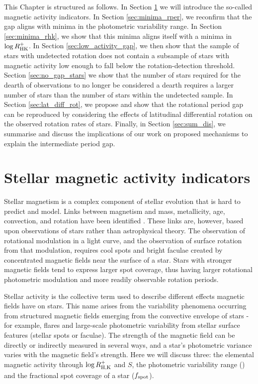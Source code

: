 This Chapter is structured as follows. In Section \ref{sec:act_ind} we will introduce the so-called magnetic activity indicators. 
In Section \ref{sec:minima_rper}, we reconfirm that the gap aligns with minima in the photometric variability range. 
In Section \ref{sec:minima_rhk}, we show that this minima aligns itself with a minima in $\log R^{+}_{\rm{HK}}$.
In Section \ref{sec:low_activity_gap}, we then show that the sample of stars with undetected rotation does not contain a subsample of stars with magnetic activity low enough to fall below the rotation-detection threshold.
Section \ref{sec:no_gap_stars} we show that the number of stars required for the dearth of observations to no longer be considered a dearth requires a larger number of stars than the number of stars within the undetected sample.
In Section \ref{sec:lat_diff_rot}, we propose and show that the rotational period gap can be reproduced by considering the effects of latitudinal differential rotation on the observed rotation rates of stars.
Finally, in Section \ref{sec:sum_dis}, we summarise and discuss the implications of our work on proposed mechanisms to explain the intermediate period gap.


\section{Stellar magnetic activity indicators}
\label{sec:act_ind}

Stellar magnetism is a complex component of stellar evolution that is hard to predict and model.
Links between magnetism and mass, metallicity, age, convection, and rotation have been identified \citep{cao_starspots_2022}.
These links are, however, based upon observations of stars rather than astrophysical theory.
The observation of rotational modulation in a light curve, and the observation of surface rotation from that modulation, requires cool spots and bright faculae created by concentrated magnetic fields near the surface of a star.
Stars with stronger magnetic fields tend to express larger spot coverage, thus having larger rotational photometric modulation and more readily observable rotation periods.

Stellar activity is the collective term used to describe different effects magnetic fields have on stars.
This name arises from the variability phenomena occurring from structured magnetic fields emerging from the convective envelope of stars - for example, flares and large-scale photometric variability from stellar surface features (stellar spots or faculae).
The strength of the magnetic field can be directly or indirectly measured in several ways, and a star's photometric variance varies with the magnetic field's strength.
Here we will discuss three: the elemental magnetic activity through $\log R^{+}_{\rm{H,K}}$ and $S$, the photometric variability range (\rper) and the fractional spot coverage of a star ($f_{\rm{spot}}$).

